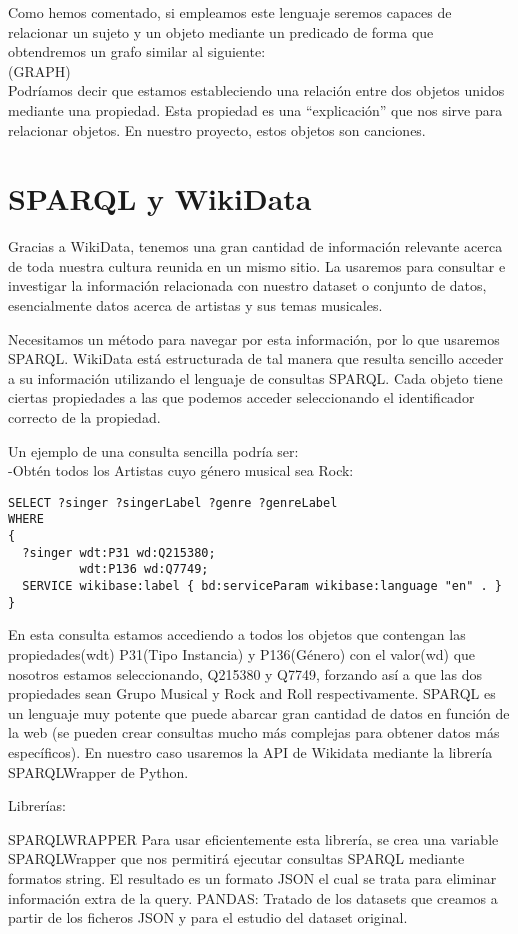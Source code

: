 Como hemos comentado, si empleamos este lenguaje seremos capaces de relacionar un sujeto y un objeto mediante un predicado de forma que obtendremos un grafo similar al siguiente:\\

(GRAPH)\\

Podríamos decir que estamos estableciendo una relación entre dos objetos unidos mediante una propiedad. Esta propiedad es una ``explicación'' que nos sirve para relacionar objetos. En nuestro proyecto, estos objetos son canciones.


\section{SPARQL y WikiData}

Gracias a WikiData, tenemos una gran cantidad de información relevante acerca de toda nuestra cultura reunida en un mismo sitio. La usaremos para consultar e investigar la información relacionada con nuestro dataset o conjunto de datos, esencialmente datos acerca de artistas y sus temas musicales.

Necesitamos un método para navegar por esta información, por lo que usaremos SPARQL. WikiData está estructurada de tal manera que resulta sencillo acceder a su información utilizando el lenguaje de consultas SPARQL. Cada objeto tiene ciertas propiedades a las que podemos acceder seleccionando el identificador correcto de la propiedad.

Un ejemplo de una consulta sencilla podría ser:\\

-Obtén todos los Artistas cuyo género musical sea Rock:\\

\begin{lstlisting}[language=SPARQL]
SELECT ?singer ?singerLabel ?genre ?genreLabel
WHERE
{
  ?singer wdt:P31 wd:Q215380;
      	  wdt:P136 wd:Q7749;
  SERVICE wikibase:label { bd:serviceParam wikibase:language "en" . }
}
\end{lstlisting}

En esta consulta estamos accediendo a todos los objetos que contengan las propiedades(wdt) P31(Tipo Instancia) y P136(Género) con el valor(wd) que nosotros estamos seleccionando, Q215380 y Q7749, forzando así a que las dos propiedades sean Grupo Musical y Rock and Roll respectivamente.
SPARQL es un lenguaje muy potente que puede abarcar gran cantidad de datos en función de la web (se pueden crear consultas mucho más complejas para obtener datos más específicos). En nuestro caso usaremos la API de Wikidata mediante la librería SPARQLWrapper de Python.

Librerías:

SPARQLWRAPPER
Para usar eficientemente esta librería, se crea una variable SPARQLWrapper que nos permitirá ejecutar consultas SPARQL mediante formatos string.
El resultado es un formato JSON el cual se trata para eliminar información extra de la query.
PANDAS:
Tratado de los datasets que creamos a partir de los ficheros JSON y para el estudio del dataset original.